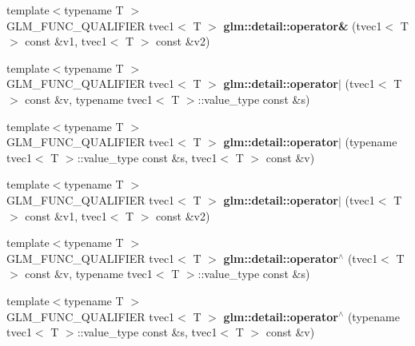 \begin{DoxyCompactItemize}
\item 
\hypertarget{namespaceglm_1_1detail_abeb95a2e5d0c64e7e90b3a8ee8a3be04}{}{\footnotesize template$<$typename T $>$ }\\G\+L\+M\+\_\+\+F\+U\+N\+C\+\_\+\+Q\+U\+A\+L\+I\+F\+I\+E\+R tvec1$<$ T $>$ {\bfseries glm\+::detail\+::operator\&} (tvec1$<$ T $>$ const \&v1, tvec1$<$ T $>$ const \&v2)\label{namespaceglm_1_1detail_abeb95a2e5d0c64e7e90b3a8ee8a3be04}

\item 
\hypertarget{namespaceglm_1_1detail_a2dd5b31e72e98dd829d0c59e444cde9f}{}{\footnotesize template$<$typename T $>$ }\\G\+L\+M\+\_\+\+F\+U\+N\+C\+\_\+\+Q\+U\+A\+L\+I\+F\+I\+E\+R tvec1$<$ T $>$ {\bfseries glm\+::detail\+::operator$\vert$} (tvec1$<$ T $>$ const \&v, typename tvec1$<$ T $>$\+::value\+\_\+type const \&s)\label{namespaceglm_1_1detail_a2dd5b31e72e98dd829d0c59e444cde9f}

\item 
\hypertarget{namespaceglm_1_1detail_a67eb55f8dc726ed768270c88e38415c4}{}{\footnotesize template$<$typename T $>$ }\\G\+L\+M\+\_\+\+F\+U\+N\+C\+\_\+\+Q\+U\+A\+L\+I\+F\+I\+E\+R tvec1$<$ T $>$ {\bfseries glm\+::detail\+::operator$\vert$} (typename tvec1$<$ T $>$\+::value\+\_\+type const \&s, tvec1$<$ T $>$ const \&v)\label{namespaceglm_1_1detail_a67eb55f8dc726ed768270c88e38415c4}

\item 
\hypertarget{namespaceglm_1_1detail_a83797a3d1074a697423d0dd416b8a6d1}{}{\footnotesize template$<$typename T $>$ }\\G\+L\+M\+\_\+\+F\+U\+N\+C\+\_\+\+Q\+U\+A\+L\+I\+F\+I\+E\+R tvec1$<$ T $>$ {\bfseries glm\+::detail\+::operator$\vert$} (tvec1$<$ T $>$ const \&v1, tvec1$<$ T $>$ const \&v2)\label{namespaceglm_1_1detail_a83797a3d1074a697423d0dd416b8a6d1}

\item 
\hypertarget{namespaceglm_1_1detail_a3e9ecd067dd9b3fc5ea95bf53777a1f0}{}{\footnotesize template$<$typename T $>$ }\\G\+L\+M\+\_\+\+F\+U\+N\+C\+\_\+\+Q\+U\+A\+L\+I\+F\+I\+E\+R tvec1$<$ T $>$ {\bfseries glm\+::detail\+::operator$^\wedge$} (tvec1$<$ T $>$ const \&v, typename tvec1$<$ T $>$\+::value\+\_\+type const \&s)\label{namespaceglm_1_1detail_a3e9ecd067dd9b3fc5ea95bf53777a1f0}

\item 
\hypertarget{namespaceglm_1_1detail_a38abb9ca72295b5e102516ad4ff2d568}{}{\footnotesize template$<$typename T $>$ }\\G\+L\+M\+\_\+\+F\+U\+N\+C\+\_\+\+Q\+U\+A\+L\+I\+F\+I\+E\+R tvec1$<$ T $>$ {\bfseries glm\+::detail\+::operator$^\wedge$} (typename tvec1$<$ T $>$\+::value\+\_\+type const \&s, tvec1$<$ T $>$ const \&v)\label{namespaceglm_1_1detail_a38abb9ca72295b5e102516ad4ff2d568}


\end{DoxyCompactItemize}
